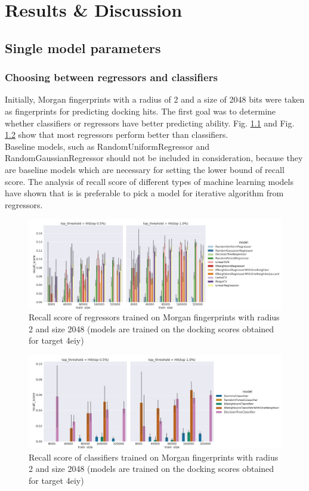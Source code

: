 \chapter{Results \& Discussion}
\section{Single model parameters}
\subsection{Choosing between regressors and classifiers}

Initially, Morgan fingerprints with a radius of 2 and a size of 2048 bits were taken as fingerprints for predicting docking hits.
The first goal was to determine whether classifiers or regressors have better predicting ability.
Fig. \ref{Regressors} and Fig. \ref{Classifiers} show that most regressors perform better than classifiers.\\

Baseline models, such as RandomUniformRegressor and RandomGaussianRegressor should not be included in consideration, because they are baseline models which are necessary for setting the lower bound of recall score.
The analysis of recall score of different types of machine learning models have shown that is is preferable to pick a model for iterative algorithm from regressors.\\

\begin{figure}[h]
\includegraphics[scale=0.25]{Images/MorganRadius2Size2048Regressor1.jpg} 
\caption{Recall score of regressors trained on Morgan fingerprints with radius 2 and size 2048 (models are trained on the docking scores obtained for target 4eiy)}
\label{Regressors}
\newpage
\end{figure}

\begin{figure}[h]
\centering
\includegraphics[scale=0.25]{Images/MorganRadius2Size2048Classifier1.jpg} 
\caption{Recall score of classifiers trained on Morgan fingerprints with radius 2 and size 2048 (models are trained on the docking scores obtained for target 4eiy)}
\label{Classifiers}
\end{figure}

